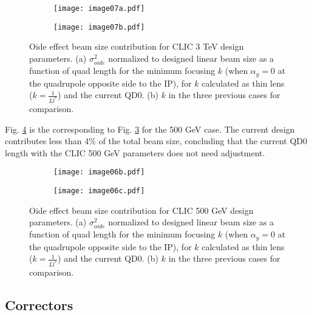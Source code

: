 \begin{figure}[!htb]
\centering
\hspace*{-0.6cm}
\begin{subfigure}{0.45\textwidth}
\centering
\texttt{[image: image07a.pdf]}\caption{}\label{fig-3TeV:a}
\end{subfigure}
\begin{subfigure}{0.45\textwidth}
\centering
\texttt{[image: image07b.pdf]}\caption{}\label{fig-3TeV:b}
\end{subfigure}
\caption{Oide effect beam size contribution for CLIC 3 TeV design parameters. (a) $\sigma^2_{oide}$ normalized to designed linear beam size as a function of quad length for the minimum focusing $k$ (when $\alpha_y=0$ at the quadrupole opposite side to the IP), for $k$ calculated as thin lens ($k=\frac{1}{Ll^*}$) and the current QD0. (b) $k$ in the three previous cases for comparison.}\label{fig-3TeV}
 \end{figure}\par
Fig. \ref{fig-500GeV} is the corresponding to Fig. \ref{fig-3TeV} for the 500 GeV case. The current design contributes less than 4\% of the total beam size, concluding that the current QD0 length with the CLIC 500 GeV parameters does not need adjustment.\par
\begin{figure}[!htb]
\centering
\hspace*{-0.6cm}
\begin{subfigure}{0.45\textwidth}
\centering
\texttt{[image: image06b.pdf]}\caption{}
\end{subfigure}
\begin{subfigure}{0.45\textwidth}
\centering
\texttt{[image: image06c.pdf]}\caption{}
\end{subfigure}
\caption{Oide effect beam size contribution for CLIC 500 GeV design parameters. (a) $\sigma^2_{oide}$ normalized to designed linear beam size as a function of quad length for the minimum focusing $k$ (when $\alpha_y=0$ at the quadrupole opposite side to the IP), for $k$ calculated as thin lens ($k=\frac{1}{Ll^*}$) and the current QD0. (b) $k$ in the three previous cases for comparison.}\label{fig-500GeV}
 \end{figure}\par

\subsection{Correctors}
